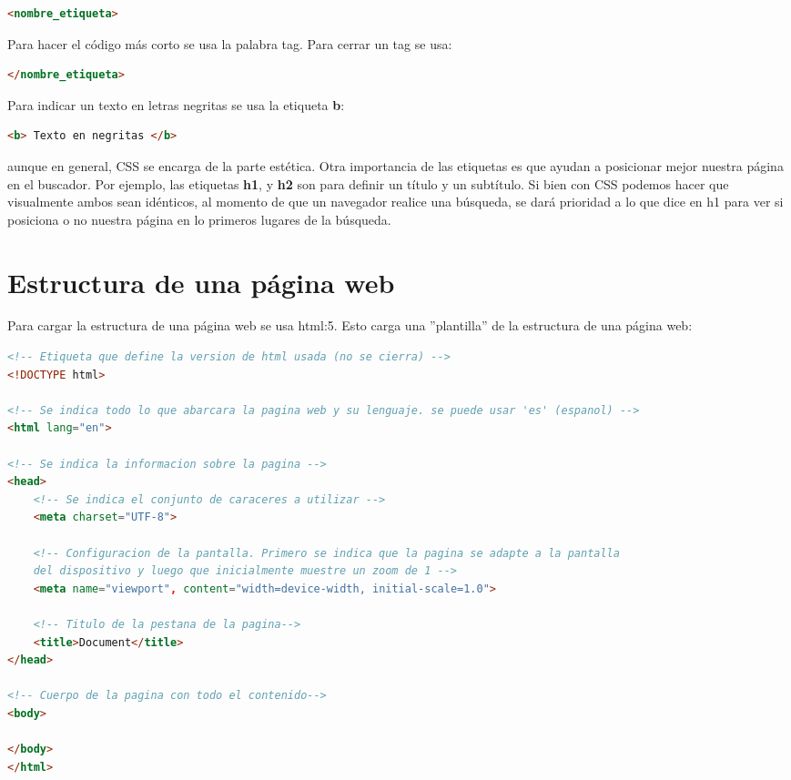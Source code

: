 \documentclass[10pt,oneside]{article}
\begin{document}
\begin{multicols}{2}
    \begin{lstlisting}[language=HTML]
<nombre_etiqueta>        
    \end{lstlisting}

    Para hacer el código más corto se usa la palabra tag. Para cerrar un tag se usa:
                
    \begin{lstlisting}[language=HTML]
</nombre_etiqueta>        
    \end{lstlisting}

    Para indicar un texto en letras negritas se usa la etiqueta \textbf{b}:
    
    \begin{lstlisting}[language=HTML]
<b> Texto en negritas </b>        
    \end{lstlisting}

    aunque en general, CSS se encarga de la parte estética. Otra importancia de las etiquetas es que ayudan a posicionar mejor nuestra página en el buscador. Por ejemplo, las etiquetas \textbf{h1}, y \textbf{h2} son para definir un título y un subtítulo. Si bien con CSS podemos hacer que visualmente ambos sean idénticos, al momento de que un navegador realice una búsqueda, se dará prioridad a lo que dice en h1 para ver si  posiciona o no nuestra página en lo primeros lugares de la búsqueda.

\section{Estructura de una página web}

    Para cargar la estructura de una página web se usa html:5. Esto carga una ''plantilla'' de la estructura de una página web: 
\end{multicols}

    \begin{lstlisting}[language=HTML]
<!-- Etiqueta que define la version de html usada (no se cierra) -->
<!DOCTYPE html>

<!-- Se indica todo lo que abarcara la pagina web y su lenguaje. se puede usar 'es' (espanol) -->
<html lang="en">

<!-- Se indica la informacion sobre la pagina -->
<head>
    <!-- Se indica el conjunto de caraceres a utilizar -->
    <meta charset="UTF-8">

    <!-- Configuracion de la pantalla. Primero se indica que la pagina se adapte a la pantalla 
    del dispositivo y luego que inicialmente muestre un zoom de 1 -->   
    <meta name="viewport", content="width=device-width, initial-scale=1.0">

    <!-- Titulo de la pestana de la pagina-->
    <title>Document</title>
</head>

<!-- Cuerpo de la pagina con todo el contenido-->
<body>
    
</body>
</html>       
    \end{lstlisting}
    
\end{document}
